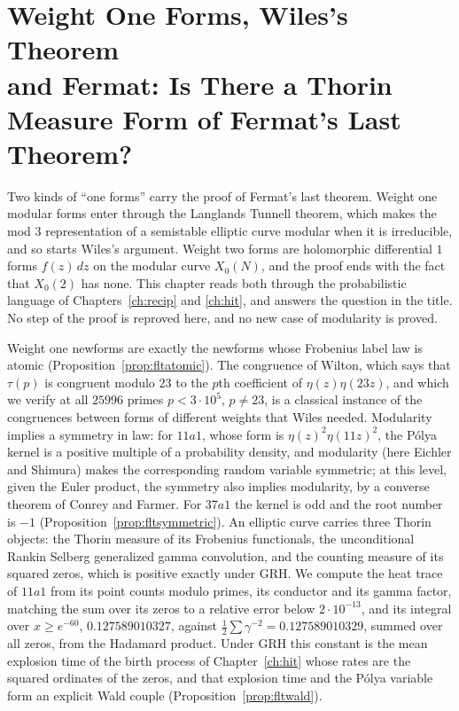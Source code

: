 \chapter[Fermat's Last Theorem and Thorin Measures]{Weight One Forms, Wiles's Theorem\\ and Fermat: Is There a Thorin\\ Measure Form of Fermat's Last Theorem?}\label{ch:flt}

Two kinds of ``one forms'' carry the proof of Fermat's last theorem. Weight one modular forms enter through the Langlands Tunnell theorem, which makes the mod $3$ representation of a semistable elliptic curve modular when it is irreducible, and so starts Wiles's argument. Weight two forms are holomorphic differential $1$ forms $f(z)\,dz$ on the modular curve $X_0(N)$, and the proof ends with the fact that $X_0(2)$ has none. This chapter reads both through the probabilistic language of Chapters~\ref{ch:recip} and \ref{ch:hit}, and answers the question in the title. No step of the proof is reproved here, and no new case of modularity is proved.

Weight one newforms are exactly the newforms whose Frobenius label law is atomic (Proposition~\ref{prop:fltatomic}). The congruence of Wilton, which says that $\tau(p)$ is congruent modulo $23$ to the $p$th coefficient of $\eta(z)\eta(23z)$, and which we verify at all $25996$ primes $p<3\cdot10^5$, $p\ne23$, is a classical instance of the congruences between forms of different weights that Wiles needed. Modularity implies a symmetry in law: for $11a1$, whose form is $\eta(z)^2\eta(11z)^2$, the P\'olya kernel is a positive multiple of a probability density, and modularity (here Eichler and Shimura) makes the corresponding random variable symmetric; at this level, given the Euler product, the symmetry also implies modularity, by a converse theorem of Conrey and Farmer. For $37a1$ the kernel is odd and the root number is $-1$ (Proposition~\ref{prop:fltsymmetric}). An elliptic curve carries three Thorin objects: the Thorin measure of its Frobenius functionals, the unconditional Rankin Selberg generalized gamma convolution, and the counting measure of its squared zeros, which is positive exactly under GRH. We compute the heat trace of $11a1$ from its point counts modulo primes, its conductor and its gamma factor, matching the sum over its zeros to a relative error below $2\cdot10^{-13}$, and its integral over $x\ge e^{-60}$, $0.127589010327$, against $\frac12\sum\gamma^{-2}=0.127589010329$, summed over all zeros, from the Hadamard product. Under GRH this constant is the mean explosion time of the birth process of Chapter~\ref{ch:hit} whose rates are the squared ordinates of the zeros, and that explosion time and the P\'olya variable form an explicit Wald couple (Proposition~\ref{prop:fltwald}).

